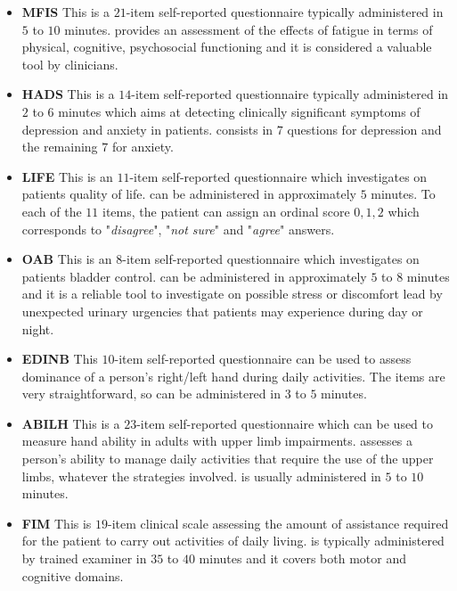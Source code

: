 \begin{itemize}
	\item[] {\sc \textbf{MFIS}} This is a $21$-item self-reported questionnaire typically administered in $5$ to $10$ minutes. \MFIS provides an assessment of the effects of fatigue in terms of physical, cognitive, psychosocial functioning and it is considered a valuable tool by clinicians.
	
	\item[] {\sc \textbf{HADS}} This is a $14$-item self-reported questionnaire typically administered in $2$ to $6$ minutes which aims at detecting clinically significant symptoms of depression and anxiety in patients. \HADS consists in $7$ questions for depression and the remaining $7$ for anxiety.
	
	\item[] {\sc \textbf{LIFE}} This is an $11$-item self-reported questionnaire which investigates on patients quality of life. \LIFE can be administered in approximately $5$ minutes. To each of the $11$ items, the patient can assign an ordinal score $0,1,2$ which corresponds to "\textit{disagree}", "\textit{not sure}" and "\textit{agree}" answers.
	
	\item[] {\sc \textbf{OAB}} This is an $8$-item self-reported questionnaire which investigates on patients bladder control. \OAB can be administered in approximately $5$ to $8$ minutes and it is a reliable tool to investigate on possible stress or discomfort lead by unexpected urinary urgencies that patients may experience during day or night.
	
	\item[] {\sc \textbf{EDINB}} This $10$-item self-reported questionnaire can be used to assess dominance of a person's right/left hand during daily activities. The items are very straightforward, so \EDINB can be administered in $3$ to $5$ minutes.
	
	\item[] {\sc \textbf{ABILH}} This is a $23$-item self-reported questionnaire which can be used to measure hand ability in adults with upper limb impairments. \ABILH assesses a person's ability to manage daily activities that require the use of the upper limbs, whatever the strategies involved. \ABILH is usually administered in $5$ to $10$ minutes.
	
	\item[] {\sc \textbf{FIM}} This is $19$-item clinical scale assessing the amount of assistance required for the patient to carry out activities of daily living. \FIM is typically administered by trained examiner in $35$ to $40$ minutes and it covers both motor and cognitive domains.


\end{itemize}

